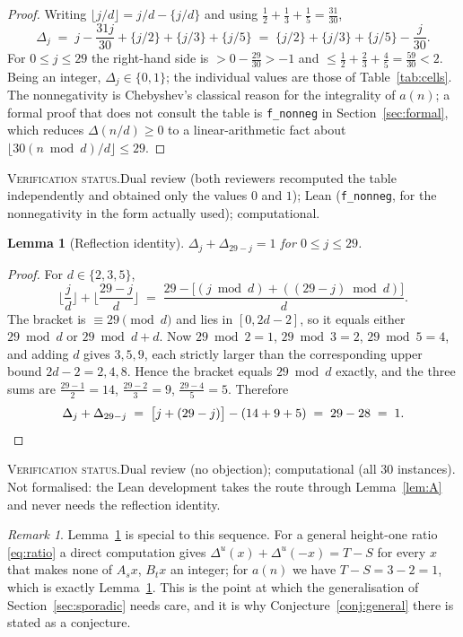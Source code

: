 \documentclass[11pt]{article}
\theoremstyle{plain}
\newtheorem{lemma}[theorem]{Lemma}
\theoremstyle{definition}
\theoremstyle{remark}
\newtheorem*{remark}{Remark}
\numberwithin{equation}{section}
\newcommand{\vstatus}[1]{%
  \par\vspace{3pt}\noindent
  {\small\textsc{Verification status.}\enspace #1}\par\vspace{3pt}}
\begin{document}
\begin{proof}
Writing $\lfloor j/d\rfloor = j/d - \{j/d\}$ and using $\tfrac12 + \tfrac13 + \tfrac15 =
\tfrac{31}{30}$,
\[
  \Delta_j \;=\; j - \frac{31j}{30} + \{j/2\} + \{j/3\} + \{j/5\}
  \;=\; \{j/2\} + \{j/3\} + \{j/5\} - \frac{j}{30} .
\]
For $0 \le j \le 29$ the right-hand side is $> 0 - \tfrac{29}{30} > -1$ and
$\le \tfrac12 + \tfrac23 + \tfrac45 = \tfrac{59}{30} < 2$. Being an integer, $\Delta_j \in
\{0,1\}$; the individual values are those of Table~\ref{tab:cells}. The nonnegativity is
Chebyshev's classical reason for the integrality of $a(n)$; a formal proof that does not consult
the table is \texttt{f\_nonneg} in Section~\ref{sec:formal}, which reduces $\Delta(n/d) \ge 0$ to
a linear-arithmetic fact about $\lfloor 30(n \bmod d)/d\rfloor \le 29$.
\end{proof}
\vstatus{Dual review (both reviewers recomputed the table independently and obtained only the
values $0$ and $1$); Lean (\texttt{f\_nonneg}, for the nonnegativity in the form actually used);
computational.}

\begin{lemma}[Reflection identity]
\label{lem:reflection}
$\Delta_j + \Delta_{29-j} = 1$ for $0 \le j \le 29$.
\end{lemma}

\begin{proof}
For $d \in \{2,3,5\}$,
\[
  \Big\lfloor \frac{j}{d}\Big\rfloor + \Big\lfloor\frac{29-j}{d}\Big\rfloor
  \;=\; \frac{29 - \bigl[(j \bmod d) + ((29-j)\bmod d)\bigr]}{d} .
\]
The bracket is $\equiv 29 \pmod d$ and lies in $[0, 2d-2]$, so it equals either $29 \bmod d$ or
$29 \bmod d + d$. Now $29 \bmod 2 = 1$, $29 \bmod 3 = 2$, $29 \bmod 5 = 4$, and adding $d$ gives
$3, 5, 9$, each strictly larger than the corresponding upper bound $2d-2 = 2, 4, 8$. Hence the
bracket equals $29 \bmod d$ exactly, and the three sums are $\tfrac{29-1}{2} = 14$,
$\tfrac{29-2}{3} = 9$, $\tfrac{29-4}{5} = 5$. Therefore
\[
  \Delta_j + \Delta_{29-j} \;=\; \bigl[j + (29-j)\bigr] - (14+9+5) \;=\; 29 - 28 \;=\; 1. \qedhere
\]
\end{proof}
\vstatus{Dual review (no objection); computational (all $30$ instances). Not formalised: the Lean
development takes the route through Lemma~\ref{lem:A} and never needs the reflection identity.}

\begin{remark}
Lemma~\ref{lem:reflection} is special to this sequence. For a general height-one ratio
\eqref{eq:ratio} a direct computation gives $\Delta^u(x) + \Delta^u(-x) = T - S$ for every $x$
that makes none of $A_s x$, $B_t x$ an integer; for $a(n)$ we have $T - S = 3 - 2 = 1$, which is
exactly Lemma~\ref{lem:reflection}. This is the point at which the generalisation of
Section~\ref{sec:sporadic} needs care, and it is why Conjecture~\ref{conj:general} there is
stated as a conjecture.
\end{remark}
\end{document}
